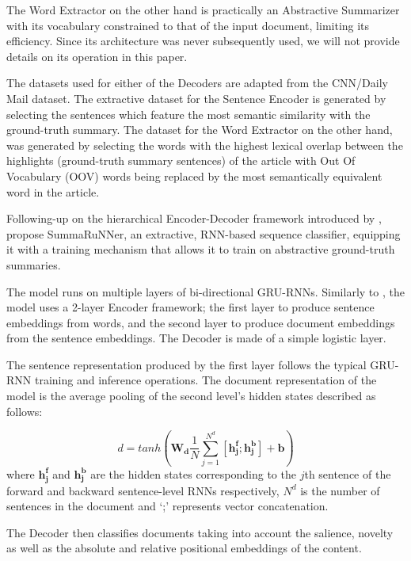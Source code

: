 \documentclass[preprint,review,12pt]{elsarticle}
\begin{document}
The Word Extractor on the other hand is practically an Abstractive Summarizer with its vocabulary constrained to that of the input document, limiting its efficiency. Since its architecture was never subsequently used, we will not provide details on its operation in this paper.

The datasets used for either of the Decoders are adapted from the CNN/Daily Mail dataset. The extractive dataset for the Sentence Encoder is generated by selecting the sentences which feature the most semantic similarity with the ground-truth summary. The dataset for the Word Extractor on the other hand, was generated by selecting the words with the highest lexical overlap between the highlights (ground-truth summary sentences) of the article with Out Of Vocabulary (OOV) words being replaced by the most semantically equivalent word in the article.

Following-up on the hierarchical Encoder-Decoder framework introduced by \citet{lapata}, \citet{nallapati} propose SummaRuNNer, an extractive, RNN-based sequence classifier, equipping it with a training mechanism that allows it to train on abstractive ground-truth summaries.

The model runs on multiple layers of bi-directional GRU-RNNs. Similarly to \citet{lapata}, the model uses a 2-layer Encoder framework; the first layer to produce sentence embeddings from words, and the second layer to produce document embeddings from the sentence embeddings. The Decoder is made of a simple logistic layer. 

The sentence representation produced by the first layer follows the typical GRU-RNN training and inference operations. The document representation of the model is the average pooling of the second level's hidden states described as follows:

\begin{equation}
    d = tanh(\mathbf{W_{d}} \frac{1}{N} \sum^{N^{d}}_{j=1}[\mathbf{h^{f}_{j}};\mathbf{h^{b}_{j}}] + \mathbf{b})
\end{equation}
where $\mathbf{h^{f}_{j}}$ and $\mathbf{h^{b}_{j}}$ are the hidden states corresponding to the $j$th sentence of the forward and backward sentence-level RNNs respectively, $N^{d}$ is the number of sentences in the document and ‘;’ represents vector concatenation. 

The Decoder then classifies documents taking into account the salience, novelty as well as the absolute and relative positional embeddings of the content.
\end{document}
